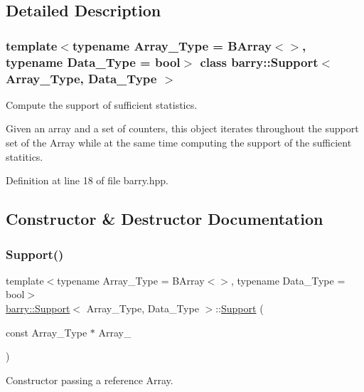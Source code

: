 \subsection{Detailed Description}
\subsubsection*{template$<$typename Array\+\_\+\+Type = B\+Array$<$$>$, typename Data\+\_\+\+Type = bool$>$\newline
class barry\+::\+Support$<$ Array\+\_\+\+Type, Data\+\_\+\+Type $>$}

Compute the support of sufficient statistics. 

Given an array and a set of counters, this object iterates throughout the support set of the Array while at the same time computing the support of the sufficient statitics. 

Definition at line 18 of file barry.\+hpp.



\subsection{Constructor \& Destructor Documentation}
\mbox{\label{classbarry_1_1_support_ab946f83af83c571de8bd5a17ce453240}} 
\subsubsection{\texorpdfstring{Support()}{Support()}\hspace{0.1cm}{\footnotesize\ttfamily [1/2]}}
{\footnotesize\ttfamily template$<$typename Array\+\_\+\+Type  = B\+Array$<$$>$, typename Data\+\_\+\+Type  = bool$>$ \\
\hyperlink{classbarry_1_1_support}{barry\+::\+Support}$<$ Array\+\_\+\+Type, Data\+\_\+\+Type $>$\+::\hyperlink{classbarry_1_1_support}{Support} (\begin{DoxyParamCaption}\item[{const Array\+\_\+\+Type $\ast$}]{Array\+\_\+ }\end{DoxyParamCaption})\hspace{0.3cm}{\ttfamily [inline]}}



Constructor passing a reference Array. 



